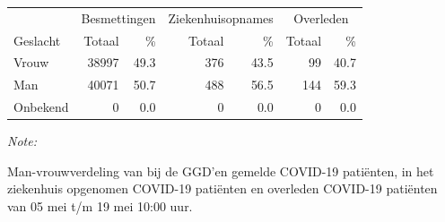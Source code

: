 \documentclass[
  english,
  man,floatsintext]{apa6}
\begin{document}
\begin{table}
\centering\begingroup\fontsize{11}{13}\selectfont

\begin{threeparttable}
\begin{tabular}{lrrrrrr}
\toprule
\multicolumn{1}{c}{ } & \multicolumn{2}{c}{Besmettingen} & \multicolumn{2}{c}{Ziekenhuisopnames} & \multicolumn{2}{c}{Overleden} \\
\cmidrule(l{3pt}r{3pt}){2-3} \cmidrule(l{3pt}r{3pt}){4-5} \cmidrule(l{3pt}r{3pt}){6-7}
Geslacht & Totaal & \% & Totaal & \% & Totaal & \%\\
\midrule
Vrouw & 38997 & 49.3 & 376 & 43.5 & 99 & 40.7\\
Man & 40071 & 50.7 & 488 & 56.5 & 144 & 59.3\\
Onbekend & 0 & 0.0 & 0 & 0.0 & 0 & 0.0\\
\bottomrule
\end{tabular}
\begin{tablenotes}
\item \textit{Note: } 
\item Man-vrouwverdeling van bij de GGD’en gemelde COVID-19 patiënten, in het ziekenhuis opgenomen COVID-19 patiënten en overleden COVID-19 patiënten van 05 mei t/m 19 mei 10:00 uur.
\end{tablenotes}
\end{threeparttable}
\endgroup{}
\end{table}
\newpage
\end{document}
